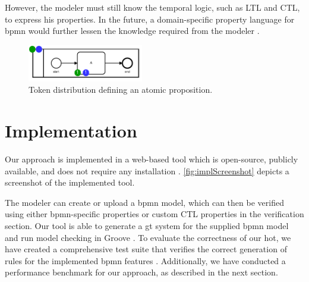 \documentclass[runningheads]{llncs}
\begin{document}
However, the modeler must still know the temporal logic, such as LTL and CTL, to express his properties.
In the future, a domain-specific property language for \gls*{bpmn} would further lessen the knowledge required from the modeler \cite{meyersProMoBoxFrameworkGenerating2014}. 


\begin{figure}[ht]
    \centering
    \includegraphics[width=0.45\textwidth]{images/bpmn_semantics-atomic-proposition.pdf}
    \caption{Token distribution defining an atomic proposition.}
    \label{fig:atomicProposition}
\end{figure}


\section{Implementation} \label{sec:impl}

Our approach is implemented in a web-based tool which is open-source, publicly available, and does not require any installation \cite{krauterArtifactsICGT2023}.
\autoref{fig:implScreenshot} depicts a screenshot of the implemented tool.

The modeler can create or upload a \gls*{bpmn} model, which can then be verified using either \gls*{bpmn}-specific properties or custom CTL properties in the verification section. 
Our tool is able to generate a \gls*{gt} system for the supplied \gls*{bpmn} model and run model checking in Groove \cite{kastenbergModelCheckingDynamic2006}. 
To evaluate the correctness of our \gls*{hot}, we have created a comprehensive test suite that verifies the correct generation of rules for the implemented \gls*{bpmn} features \cite{krauterArtifactsICGT2023}.
Additionally, we have conducted a performance benchmark for our approach, as described in the next section.
\end{document}
